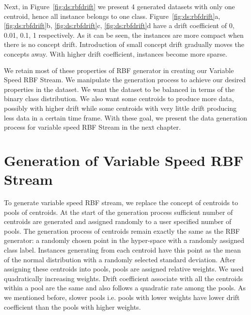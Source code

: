 Next, in Figure~\ref{fig:ds:rbfdrift} we present 4 generated datasets with only one centroid, hence all instance belongs to one class. Figure~\ref{fig:ds:rbfdrift}a, \ref{fig:ds:rbfdrift}b, \ref{fig:ds:rbfdrift}c, \ref{fig:ds:rbfdrift}d have a drift coefficient of 0, 0.01, 0.1, 1 respectively. As it can be seen, the instances are more compact when there is no concept drift. Introduction of small concept drift gradually moves the concepts away. With higher drift coefficient, instances become more sparse.

We retain most of these properties of RBF generator in creating our Variable Speed RBF Stream. We manipulate the generation process to achieve our desired properties in the dataset. We want the dataset to be balanced in terms of the binary class distribution. We also want some centroids to produce more data, possibly with higher drift while some centroids with very little drift producing less data in a certain time frame. With these goal, we present the data generation process for variable speed RBF Stream in the next chapter.

\section{Generation of Variable Speed RBF Stream}
To generate variable speed RBF stream, we replace the concept of centroids to pools of centroids. At the start of the generation process sufficient number of centroids are generated and assigned randomly to a user specified number of pools. The generation process of centroids remain exactly the same as the RBF generator: a randomly chosen point in the hyper-space with a randomly assigned class label. Instances generating from each centroid have this point as the mean of the normal distribution with a randomly selected standard deviation. After assigning these centroids into pools, pools are assigned relative weights. We used quadratically increasing weights. Drift coefficient associate with all the centroids within a pool are the same and also follows a quadratic rate among the pools. As we mentioned before, slower pools i.e. pools with lower weights have lower drift coefficient than the pools with higher weights.


